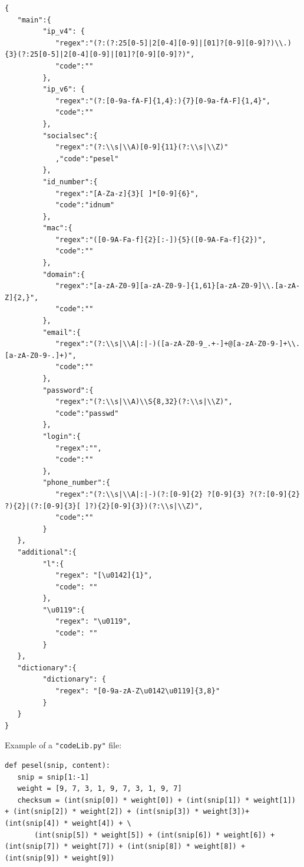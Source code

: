 \documentclass[a4paper,twoside,12pt]{book}
\begin{document}
\begin{appendices}
\begin{lstlisting}
{
   "main":{
         "ip_v4": {
            "regex":"(?:(?:25[0-5]|2[0-4][0-9]|[01]?[0-9][0-9]?)\\.){3}(?:25[0-5]|2[0-4][0-9]|[01]?[0-9][0-9]?)",
            "code":""
         },
         "ip_v6": {
            "regex":"(?:[0-9a-fA-F]{1,4}:){7}[0-9a-fA-F]{1,4}",
            "code":""
         },
         "socialsec":{
            "regex":"(?:\\s|\\A)[0-9]{11}(?:\\s|\\Z)"
            ,"code":"pesel"
         },
         "id_number":{
            "regex":"[A-Za-z]{3}[ ]*[0-9]{6}",
            "code":"idnum"
         },
         "mac":{
            "regex":"([0-9A-Fa-f]{2}[:-]){5}([0-9A-Fa-f]{2})",
            "code":""
         },
         "domain":{
            "regex":"[a-zA-Z0-9][a-zA-Z0-9-]{1,61}[a-zA-Z0-9]\\.[a-zA-Z]{2,}",
            "code":""
         },
         "email":{
            "regex":"(?:\\s|\\A|:|-)([a-zA-Z0-9_.+-]+@[a-zA-Z0-9-]+\\.[a-zA-Z0-9-.]+)",
            "code":""
         },
         "password":{
            "regex":"(?:\\s|\\A)\\S{8,32}(?:\\s|\\Z)",
            "code":"passwd"
         },
         "login":{
            "regex":"",
            "code":""
         },
         "phone_number":{
            "regex":"(?:\\s|\\A|:|-)(?:[0-9]{2} ?[0-9]{3} ?(?:[0-9]{2} ?){2}|(?:[0-9]{3}[ ]?){2}[0-9]{3})(?:\\s|\\Z)",
            "code":""
         }
   },
   "additional":{
         "l":{
            "regex": "[\u0142]{1}",
            "code": ""
         },
         "\u0119":{
            "regex": "\u0119",
            "code": ""
         }
   },
   "dictionary":{
         "dictionary": {
            "regex": "[0-9a-zA-Z\u0142\u0119]{3,8}"
         }
   }
}
\end{lstlisting}

Example of a \lstinline|"codeLib.py"| file:

\begin{lstlisting}
def pesel(snip, content):
   snip = snip[1:-1]
   weight = [9, 7, 3, 1, 9, 7, 3, 1, 9, 7]
   checksum = (int(snip[0]) * weight[0]) + (int(snip[1]) * weight[1]) + (int(snip[2]) * weight[2]) + (int(snip[3]) * weight[3])+ (int(snip[4]) * weight[4]) + \
       (int(snip[5]) * weight[5]) + (int(snip[6]) * weight[6]) + (int(snip[7]) * weight[7]) + (int(snip[8]) * weight[8]) + (int(snip[9]) * weight[9])


\end{lstlisting}
\end{appendices}
\end{document}
